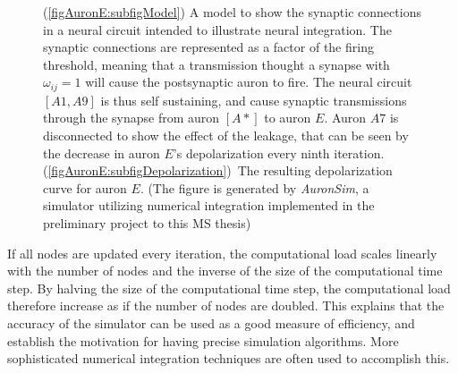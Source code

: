 \begin{figure} %
    \centering
    \caption{ %
			(\ref{figAuronE:subfigModel}) A model to show the synaptic connections in a neural circuit intended to illustrate neural integration.
			The synaptic connections are represented as a factor of the firing threshold, meaning that a transmission thought a synapse with $\omega_{ij}=1$ will cause the postsynaptic auron to fire.
			The neural circuit $[A1, A9]$ is thus self sustaining, and cause synaptic transmissions through the synapse from auron $[A*]$ to auron $E$.
			Auron $A7$ is disconnected to show the effect of the leakage, that can be seen by the decrease in auron $E$'s depolarization every ninth iteration.
			\mbox{(\ref{figAuronE:subfigDepolarization}) The} resulting depolarization curve for auron $E$.
			(The figure is generated by \emph{AuronSim}, a simulator utilizing numerical integration implemented in the preliminary project to this MS thesis) %
				}
    \label{figExperiment2}
\end{figure}






	If all nodes are updated every iteration, the computational load scales linearly with the number of nodes and the inverse of the size of the computational time step.
	By halving the size of the computational time step, the computational load therefore increase as if the number of nodes are doubled.
	This explains that the accuracy of the simulator can be used as a good measure of efficiency, and establish the motivation for having precise simulation algorithms.
	More sophisticated numerical integration techniques are often used to accomplish this.





